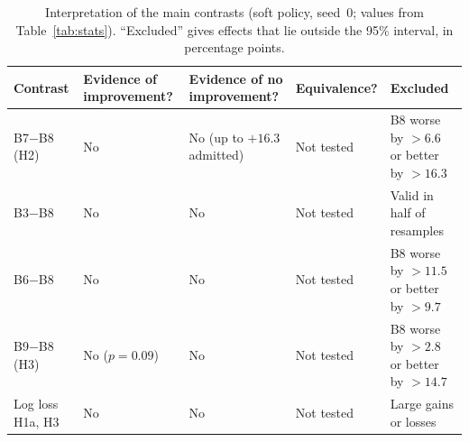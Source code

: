 \begin{table}[!t]
\caption{Interpretation of the main contrasts (soft policy, seed~0; values from Table~\ref{tab:stats}). ``Excluded'' gives effects that lie outside the 95\% interval, in percentage points.}
\label{tab:interp}
\centering
\scriptsize
\setlength{\tabcolsep}{2.3pt}
\begin{tabular}{|L{1.35cm}|L{1.3cm}|L{1.35cm}|L{1.25cm}|L{1.55cm}|}
\hline
Contrast & Evidence of improvement? & Evidence of no improvement? & Equivalence? & Excluded \\
\hline
B7$-$B8 (H2) & No & No (up to $+16.3$ admitted) & Not tested & B8 worse by $>6.6$ or better by $>16.3$ \\
B3$-$B8 & No & No & Not tested & Valid in half of resamples \\
B6$-$B8 & No & No & Not tested & B8 worse by $>11.5$ or better by $>9.7$ \\
B9$-$B8 (H3) & No ($p=0.09$) & No & Not tested & B8 worse by $>2.8$ or better by $>14.7$ \\
Log loss H1a, H3 & No & No & Not tested & Large gains or losses \\
\hline
\end{tabular}
\end{table}

